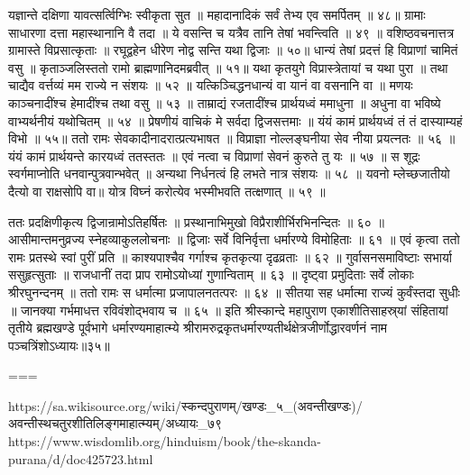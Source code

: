 यज्ञान्ते दक्षिणा यावत्सर्त्विग्भिः स्वीकृता सुत ॥
महादानादिकं सर्वं तेभ्य एव समर्पितम् ॥ ४८॥
ग्रामाः साधारणा दत्ता महास्थानानि वै तदा ॥
ये वसन्ति च यत्रैव तानि तेषां भवन्त्विति ॥ ४९ ॥
वशिष्ठवचनात्तत्र ग्रामास्ते विप्रसात्कृताः ॥
रघूद्वहेन धीरेण नोद्व सन्ति यथा द्विजाः ॥ ५०॥
धान्यं तेषां प्रदत्तं हि विप्राणां चामितं वसु ॥
कृताञ्जलिस्ततो रामो ब्राह्मणानिदमब्रवीत् ॥ ५१॥
यथा कृतयुगे विप्रास्त्रेतायां च यथा पुरा ॥
तथा चाद्यैव वर्त्तव्यं मम राज्ये न संशयः ॥ ५२ ॥
यत्किञ्चिद्धनधान्यं वा यानं वा वसनानि वा ॥
मणयः काञ्चनादींश्च हेमादींश्च तथा वसु ॥ ५३ ॥
ताम्राद्यं रजतादींश्च प्रार्थयध्वं ममाधुना ॥
अधुना वा भविष्ये वाभ्यर्थनीयं यथोचितम् ॥ ५४ ॥
प्रेषणीयं वाचिकं मे सर्वदा द्विजसत्तमाः ॥
यंयं कामं प्रार्थयध्वं तं तं दास्याम्यहं विभो ॥ ५५॥
ततो रामः सेवकादीनादरात्प्रत्यभाषत ॥
विप्राज्ञा नोल्लङ्घनीया सेव नीया प्रयत्नतः ॥ ५६ ॥
यंयं कामं प्रार्थयन्ते कारयध्वं ततस्ततः ॥
एवं नत्वा च विप्राणां सेवनं कुरुते तु यः ॥ ५७ ॥
स शूद्रः स्वर्गमाप्नोति धनवान्पुत्रवान्भवेत् ॥
अन्यथा निर्धनत्वं हि लभते नात्र संशयः ॥ ५८ ॥
यवनो म्लेच्छजातीयो दैत्यो वा राक्षसोपि वा॥
योत्र विघ्नं करोत्येव भस्मीभवति तत्क्षणात् ॥ ५९ ॥

ततः प्रदक्षिणीकृत्य द्विजान्रामोऽतिहर्षितः ॥
प्रस्थानाभिमुखो विप्रैराशीर्भिरभिनन्दितः ॥ ६० ॥
आसीमान्तमनुव्रज्य स्नेहव्याकुललोचनाः ॥
द्विजाः सर्वे विनिर्वृत्ता धर्मारण्ये विमोहिताः ॥ ६१ ॥
एवं कृत्वा ततो रामः प्रतस्थे स्वां पुरीं प्रति ॥
काश्यपाश्चैव गर्गाश्च कृतकृत्या दृढव्रताः ॥ ६२ ॥
गुर्वासनसमाविष्टाः सभार्या ससुहृत्सुताः ॥
राजधानीं तदा प्राप रामोऽयोध्यां गुणान्विताम् ॥ ६३ ॥
दृष्ट्वा प्रमुदिताः सर्वे लोकाः श्रीरघुनन्दनम् ॥
ततो रामः स धर्मात्मा प्रजापालनतत्परः ॥ ६४ ॥
सीतया सह धर्मात्मा राज्यं कुर्वंस्तदा सुधीः ॥
जानक्या गर्भमाधत्त रविवंशोद्भवाय च ॥ ६५ ॥
इति श्रीस्कान्दे महापुराण एकाशीतिसाहस्र्यां संहितायां तृतीये ब्रह्मखण्डे पूर्वभागे धर्मारण्यमाहात्म्ये श्रीरामरुद्रकृतधर्मारण्यतीर्थक्षेत्रजीर्णोद्धारवर्णनं नाम पञ्चत्रिंशोऽध्यायः॥३५॥

===

https://sa.wikisource.org/wiki/स्कन्दपुराणम्/खण्डः_५_(अवन्तीखण्डः)/अवन्तीस्थचतुरशीतिलिङ्गमाहात्म्यम्/अध्यायः_७९
https://www.wisdomlib.org/hinduism/book/the-skanda-purana/d/doc425723.html



